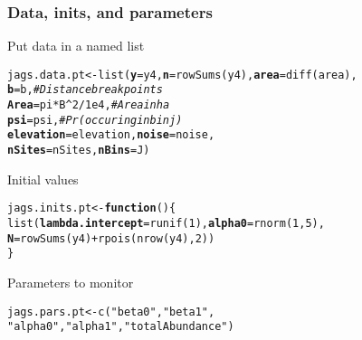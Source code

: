 \documentclass[color=usenames,dvipsnames]{beamer}\usepackage[]{graphicx}\usepackage[]{xcolor}
\makeatletter
\newcommand{\hlnum}[1]{\textcolor[rgb]{0.69,0.494,0}{#1}}%
\newcommand{\hlsng}[1]{\textcolor[rgb]{0.749,0.012,0.012}{#1}}%
\newcommand{\hlcom}[1]{\textcolor[rgb]{0.514,0.506,0.514}{\textit{#1}}}%
\newcommand{\hlopt}[1]{\textcolor[rgb]{0,0,0}{#1}}%
\newcommand{\hldef}[1]{\textcolor[rgb]{0,0,0}{#1}}%
\newcommand{\hlkwa}[1]{\textcolor[rgb]{0,0,0}{\textbf{#1}}}%
\newcommand{\hlkwb}[1]{\textcolor[rgb]{0,0.341,0.682}{#1}}%
\newcommand{\hlkwc}[1]{\textcolor[rgb]{0,0,0}{\textbf{#1}}}%
\newcommand{\hlkwd}[1]{\textcolor[rgb]{0.004,0.004,0.506}{#1}}%
\newenvironment{kframe}{%
 \def\at@end@of@kframe{}%
 \ifinner\ifhmode%
  \def\at@end@of@kframe{\end{minipage}}%
  \begin{minipage}{\columnwidth}%
 \fi\fi%
 \def\FrameCommand##1{\hskip\@totalleftmargin \hskip-\fboxsep
 \colorbox{shadecolor}{##1}\hskip-\fboxsep
     \hskip-\linewidth \hskip-\@totalleftmargin \hskip\columnwidth}%
 \MakeFramed {\advance\hsize-\width
   \@totalleftmargin\z@ \linewidth\hsize
   \@setminipage}}%
 {\par\unskip\endMakeFramed%
 \at@end@of@kframe}
\newenvironment{knitrout}{}{} %
\makeatother
\begin{document}
\begin{frame}[fragile]
  \frametitle{Data, inits, and parameters}
  Put data in a named list
  \vspace{-12pt}
\begin{knitrout}\footnotesize
{}\color{fgcolor}\begin{kframe}
\begin{alltt}
\hldef{jags.data.pt} \hlkwb{<-} \hlkwd{list}\hldef{(}\hlkwc{y}\hldef{=y4,} \hlkwc{n}\hldef{=}\hlkwd{rowSums}\hldef{(y4),} \hlkwc{area}\hldef{=}\hlkwd{diff}\hldef{(area),}
                     \hlkwc{b}\hldef{=b,}              \hlcom{# Distance break points}
                     \hlkwc{Area}\hldef{=pi}\hlopt{*}\hldef{B}\hlopt{^}\hlnum{2}\hlopt{/}\hlnum{1e4}\hldef{,}  \hlcom{# Area in ha}
                     \hlkwc{psi}\hldef{=psi,}          \hlcom{# Pr(occuring in bin j)}
                     \hlkwc{elevation}\hldef{=elevation,} \hlkwc{noise}\hldef{=noise,}
                     \hlkwc{nSites}\hldef{=nSites,} \hlkwc{nBins}\hldef{=J)}
\end{alltt}
\end{kframe}
\end{knitrout}
\pause
\vfill
  Initial values
  \vspace{-12pt}
\begin{knitrout}\footnotesize
{}\color{fgcolor}\begin{kframe}
\begin{alltt}
\hldef{jags.inits.pt} \hlkwb{<-} \hlkwa{function}\hldef{() \{}
    \hlkwd{list}\hldef{(}\hlkwc{lambda.intercept}\hldef{=}\hlkwd{runif}\hldef{(}\hlnum{1}\hldef{),} \hlkwc{alpha0}\hldef{=}\hlkwd{rnorm}\hldef{(}\hlnum{1}\hldef{,} \hlnum{5}\hldef{),}
         \hlkwc{N}\hldef{=}\hlkwd{rowSums}\hldef{(y4)}\hlopt{+}\hlkwd{rpois}\hldef{(}\hlkwd{nrow}\hldef{(y4),} \hlnum{2}\hldef{))}
\hldef{\}}
\end{alltt}
\end{kframe}
\end{knitrout}
\pause
\vfill
  Parameters to monitor
  \vspace{-12pt}
\begin{knitrout}\small
{}\color{fgcolor}\begin{kframe}
\begin{alltt}
\hldef{jags.pars.pt} \hlkwb{<-} \hlkwd{c}\hldef{(}\hlsng{"beta0"}\hldef{,} \hlsng{"beta1"}\hldef{,}
                  \hlsng{"alpha0"}\hldef{,} \hlsng{"alpha1"}\hldef{,} \hlsng{"totalAbundance"}\hldef{)}
\end{alltt}
\end{kframe}
\end{knitrout}
\end{frame}
\end{document}
